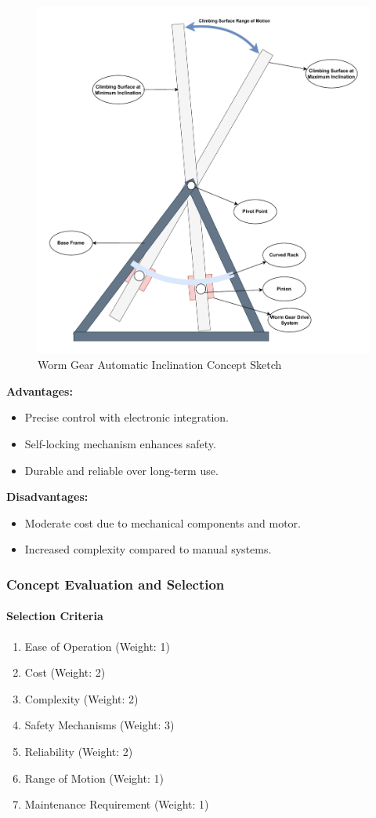 \begin{figure}[H]
    \centering
    \includegraphics[width=0.6\linewidth]{figs/concept_design/WormGear_Concept.pdf}
    \caption{Worm Gear Automatic Inclination Concept Sketch}
    \label{fig:wormgear-concept}
\end{figure}

\textbf{Advantages:}
\begin{itemize}
    \item Precise control with electronic integration.
    \item Self-locking mechanism enhances safety.
    \item Durable and reliable over long-term use.
\end{itemize}

\textbf{Disadvantages:}
\begin{itemize}
    \item Moderate cost due to mechanical components and motor.
    \item Increased complexity compared to manual systems.
\end{itemize}

\subsubsection{Concept Evaluation and Selection}

\paragraph{Selection Criteria}

\begin{enumerate}
    \item Ease of Operation (Weight: 1)
    \item Cost (Weight: 2)
    \item Complexity (Weight: 2)
    \item Safety Mechanisms (Weight: 3)
    \item Reliability (Weight: 2)
    \item Range of Motion (Weight: 1)
    \item Maintenance Requirement (Weight: 1)
\end{enumerate}

